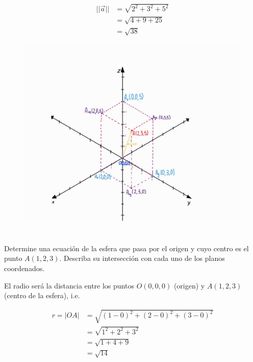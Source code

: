 \documentclass[12pt]{article}
\begin{document}
\begin{itemize}
  \begin{equation*}
    \begin{split}
      ||\vec{a}|| &= \sqrt{2^2 +  3^2 + 5^2} \\
      &= \sqrt{4 +  9 + 25} \\
      &= \sqrt{38}
    \end{split}
  \end{equation*}
  
  \begin{figure}[H]
    \centering
    \includegraphics[width=1\textwidth]{./img/diagonal.jpeg}
  \end{figure}
\end{itemize}

\section{}

Determine una ecuación de la esfera que pasa por el origen y cuyo centro es el punto $A(1,2,3)$. Describa su intersección con cada uno de los planos coordenados.

El radio será la distancia entre los puntos $O(0,0,0)$ (origen) y $A(1,2,3)$ (centro de la esfera), i.e.

\begin{align*}
  r = |OA|
  &= \sqrt{(1-0)^2 + (2-0)^2 + (3-0)^2} \\
  &= \sqrt{1^2 + 2^2 + 3^2} \\
  &= \sqrt{1 + 4 + 9} \\
  &= \sqrt{14}
\end{align*}
\end{document}
